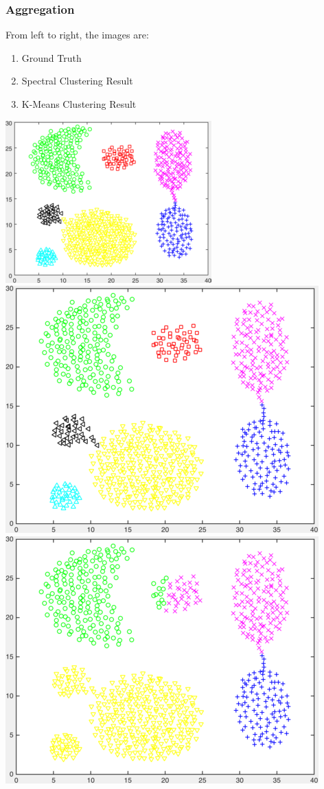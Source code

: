 \documentclass[11pt]{article}
\begin{document}
\subsubsection*{Aggregation} 
From left to right, the images are:
\begin{enumerate}
\item Ground Truth
\item Spectral Clustering Result
\item K-Means Clustering Result
\end{enumerate}
\begin{center}
\includegraphics[scale=0.5]{aggregation} \ 
\includegraphics[scale=0.25]{results_spectral_aggregation} \ 
\includegraphics[scale=0.25]{results_kmeans_aggregation}
\end{center}
\end{document}
